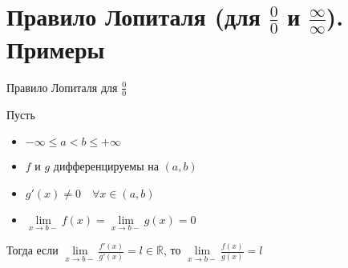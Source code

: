 \section{Правило Лопиталя (для $\frac{0}{0}$ и $\frac{\infty}{\infty}$). Примеры}

\begin{theorem-non} 
    Правило Лопиталя для $\frac{0}{0}$

    Пусть 
    \begin{itemize}
        \item $-\infty \leq a < b \leq +\infty$
        \item $f$ и $g$ дифференцируемы на $(a, b)$
        \item $g'(x) \neq 0 \quad \forall x \in (a, b)$
        \item $\lim\limits_{x \rightarrow b-} f(x) = \lim\limits_{x \rightarrow b-} g(x) = 0$
    \end{itemize}
    Тогда если $\lim\limits_{x \rightarrow b-}\frac{f'(x)}{g'(x)} = l \in \overline{\mathbb{R}}$, 
    то $\lim\limits_{x \rightarrow b-}\frac{f(x)}{g(x)} = l$
\end{theorem-non}
